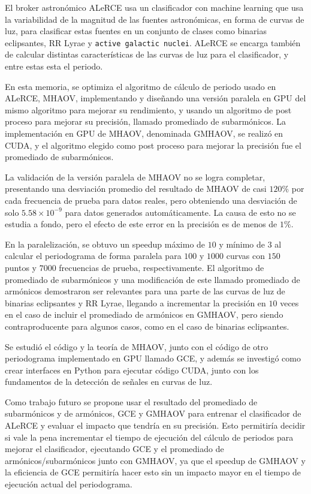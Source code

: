 
El broker astronómico ALeRCE usa un clasificador con machine learning que usa la variabilidad de la magnitud de las fuentes astronómicas, en forma de curvas de luz, para clasificar estas fuentes en un conjunto de clases como binarias eclipsantes, RR Lyrae y \texttt{active galactic nuclei}. ALeRCE se encarga también de calcular distintas características de las curvas de luz para el clasificador, y entre estas esta el periodo.

En esta memoria, se optimiza el algoritmo de cálculo de periodo usado en ALeRCE, MHAOV, implementando y diseñando una versión paralela en GPU del mismo algoritmo para mejorar su rendimiento, y usando un algoritmo de post proceso para mejorar su precisión, llamado promediado de subarmónicos. La implementación en GPU de MHAOV, denominada GMHAOV, se realizó en CUDA, y el algoritmo elegido como post proceso para mejorar la precisión fue el promediado de subarmónicos.

La validación de la versión paralela de MHAOV no se logra completar, presentando una desviación promedio del resultado de MHAOV de casi $120\%$ por cada frecuencia de prueba para datos reales, pero obteniendo una desviación de solo $5.58 \times 10^{-9}$ para datos generados automáticamente. La causa de esto no se estudia a fondo, pero el efecto de este error en la precisión es de menos de $1\%$.

En la paralelización, se obtuvo un speedup máximo de $10$ y mínimo de $3$ al calcular el periodograma de forma paralela para $100$ y $1000$ curvas con $150$ puntos y $7000$ frecuencias de prueba, respectivamente. El algoritmo de promediado de subarmónicos y una modificación de este llamado promediado de armónicos demostraron ser relevantes para una parte de las curvas de luz de binarias eclipsantes y RR Lyrae, llegando a incrementar la precisión en $10$ veces en el caso de incluir el promediado de armónicos en GMHAOV, pero siendo contraproducente para algunos casos, como en el caso de binarias eclipsantes.

Se estudió el código y la teoría de MHAOV, junto con el código de otro periodograma implementado en GPU llamado GCE, y además se investigó como crear interfaces en Python para ejecutar código CUDA, junto con los fundamentos de la detección de señales en curvas de luz.

Como trabajo futuro se propone usar el resultado del promediado de subarmónicos y de armónicos, GCE y GMHAOV para entrenar el clasificador de ALeRCE y evaluar el impacto que tendría en su precisión. Esto permitiría decidir si vale la pena incrementar el tiempo de ejecución del cálculo de periodos para mejorar el clasificador, ejecutando GCE y el promediado de armónicos/subarmónicos junto con GMHAOV, ya que el speedup de GMHAOV y la eficiencia de GCE permitiría hacer esto sin un impacto mayor en el tiempo de ejecución actual del periodograma.




